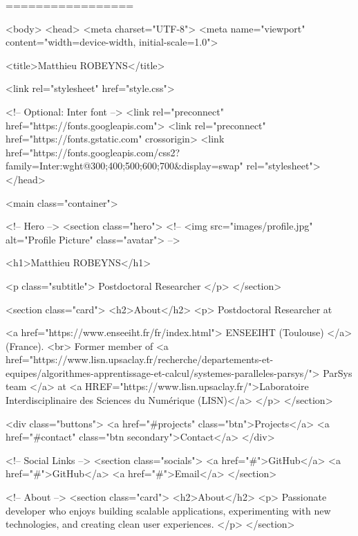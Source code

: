 =================


<body>
    <head>
        <meta charset="UTF-8">
        <meta name="viewport" content="width=device-width, initial-scale=1.0">

        <title>Matthieu ROBEYNS</title>

        <link rel="stylesheet" href="style.css">

        <!-- Optional: Inter font -->
        <link rel="preconnect" href="https://fonts.googleapis.com">
        <link rel="preconnect" href="https://fonts.gstatic.com" crossorigin>
        <link
            href="https://fonts.googleapis.com/css2?family=Inter:wght@300;400;500;600;700&display=swap"
            rel="stylesheet">
    </head>

    <main class="container">

        <!-- Hero -->
        <section class="hero">
            <!-- <img src="images/profile.jpg" alt="Profile Picture" class="avatar"> -->

            <h1>Matthieu ROBEYNS</h1>

            <p class="subtitle">
                Postdoctoral Researcher
            </p>
        </section>

        <section class="card">
            <h2>About</h2>
            <p>
                Postdoctoral Researcher at

                <a href="https://www.enseeiht.fr/fr/index.html">
                    ENSEEIHT (Toulouse)
                </a> (France).
                <br>
                Former member of
                <a
                    href="https://www.lisn.upsaclay.fr/recherche/departements-et-equipes/algorithmes-apprentissage-et-calcul/systemes-paralleles-parsys/">
                    ParSys team
                </a>
                at <a HREF="https://www.lisn.upsaclay.fr/">Laboratoire
                    Interdisciplinaire des Sciences du
                    Numérique (LISN)</a>
            </p>
        </section>

        <div class="buttons">
            <a href="#projects" class="btn">Projects</a>
            <a href="#contact" class="btn secondary">Contact</a>
        </div>

        <!-- Social Links -->
        <section class="socials">
            <a href="#">GitHub</a>
            <a href="#">GitHub</a>
            <a href="#">Email</a>
        </section>

        <!-- About -->
        <section class="card">
            <h2>About</h2>
            <p>
                Passionate developer who enjoys building scalable applications,
                experimenting with new technologies, and creating clean user
                experiences.
            </p>
        </section>

